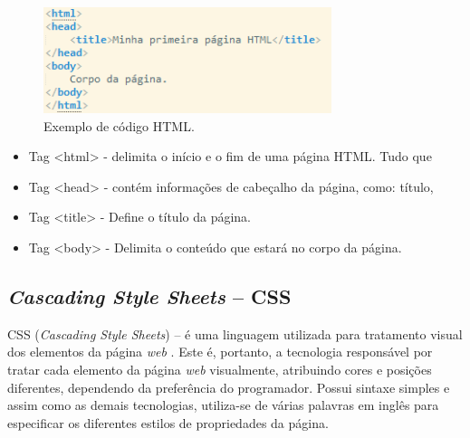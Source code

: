 \documentclass[
	12pt,				%
    oneside,			%
	a4paper,			%
	english,			%
	french,				%
	spanish,			%
	brazil,				%
	]{abntex2}
\begin{document}
\begin{figure} [hbt] 
\label{figura1} 
\caption{Exemplo de código HTML.}
\begin{center}
\includegraphics[width=0.75\textwidth]{exhtml.png} %
\end{center}
\end{figure}

\begin{itemize}

	\item Tag <html> - delimita o início e o fim de uma página HTML. Tudo que
	\item Tag <head> - contém informações de cabeçalho da página, como: título,
	\item Tag <title> - Define o título da página.
	\item Tag <body> - Delimita o conteúdo que estará no corpo da página.

\end{itemize}


\subsection{\textit{Cascading Style Sheets} – CSS}

CSS (\textit{Cascading Style Sheets}) – é uma linguagem utilizada para tratamento
visual dos elementos da página \textit{web} \cite{folle}. Este é, portanto, a tecnologia
responsável por tratar cada elemento da página \textit{web} visualmente, atribuindo cores e
posições diferentes, dependendo da preferência do programador. Possui sintaxe
simples e assim como as demais tecnologias, utiliza-se de várias palavras em inglês
para especificar os diferentes estilos de propriedades da página.
\end{document}
